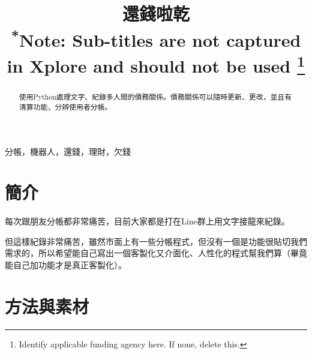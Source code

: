 \documentclass[conference]{IEEEtran}
\begin{document}
\begin{CJK*}{UTF8}{bsmi}

\title{還錢啦乾\\
{\footnotesize \textsuperscript{*}Note: Sub-titles are not captured in Xplore and
should not be used}
\thanks{Identify applicable funding agency here. If none, delete this.}
}

\author{
\and
{}
\and
{}
\and
{}
\and
{}
\and
{}
}

\maketitle

\begin{abstract}
使用Python處理文字、紀錄多人間的債務關係。債務關係可以隨時更新、更改，並且有清算功能，分辨使用者分帳。
\end{abstract}

\begin{IEEEkeywords}
分帳，機器人，還錢，理財，欠錢
\end{IEEEkeywords}

\section{簡介}
每次跟朋友分帳都非常痛苦，目前大家都是打在Line群上用文字接龍來紀錄。

但這樣紀錄非常痛苦，雖然市面上有一些分帳程式，但沒有一個是功能很貼切我們需求的，所以希望能自己寫出一個客製化又介面化、人性化的程式幫我們算（畢竟能自己加功能才是真正客製化）。
\section{方法與素材}


\end{CJK*}
\end{document}
